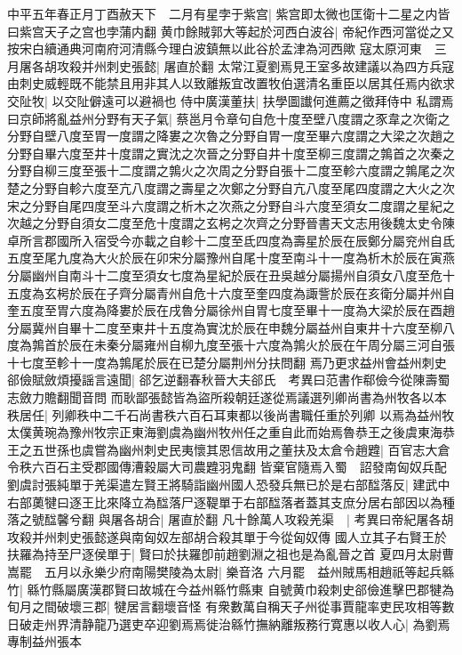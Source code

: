 中平五年春正月丁酉赦天下　二月有星孛于紫宫|{
	紫宫即太微也匡衛十二星之内皆曰紫宫天子之宫也孛蒲内翻}
黄巾餘賊郭大等起於河西白波谷|{
	帝紀作西河當從之又按宋白續通典河南府河清縣今理白波鎮無以此谷於孟津為河西歟}
寇太原河東　三月屠各胡攻殺并州刺史張懿|{
	屠直於翻}
太常江夏劉焉見王室多故建議以為四方兵寇由刺史威輕既不能禁且用非其人以致離叛宜改置牧伯選清名重臣以居其任焉内欲求交阯牧|{
	以交阯僻遠可以避禍也}
侍中廣漢董扶|{
	扶學圖䜟何進薦之徵拜侍中}
私謂焉曰京師將亂益州分野有天子氣|{
	蔡邕月令章句自危十度至壁八度謂之豕韋之次衛之分野自壁八度至胃一度謂之降婁之次魯之分野自胃一度至畢六度謂之大梁之次趙之分野自畢六度至井十度謂之實沈之次晉之分野自井十度至柳三度謂之鶉首之次秦之分野自柳三度至張十二度謂之鶉火之次周之分野自張十二度至軫六度謂之鶉尾之次楚之分野自軫六度至亢八度謂之壽星之次鄭之分野自亢八度至尾四度謂之大火之次宋之分野自尾四度至斗六度謂之析木之次燕之分野自斗六度至須女二度謂之星紀之次越之分野自須女二度至危十度謂之玄枵之次齊之分野晉書天文志用後魏太史令陳卓所言郡國所入宿受今亦載之自軫十二度至氐四度為壽星於辰在辰鄭分屬兖州自氐五度至尾九度為大火於辰在卯宋分屬豫州自尾十度至南斗十一度為析木於辰在寅燕分屬幽州自南斗十二度至須女七度為星紀於辰在丑吳越分屬揚州自須女八度至危十五度為玄枵於辰在子齊分屬青州自危十六度至奎四度為諏訾於辰在亥衛分屬并州自奎五度至胃六度為降婁於辰在戌魯分屬徐州自胃七度至畢十一度為大梁於辰在酉趙分屬冀州自畢十二度至東井十五度為實沈於辰在申魏分屬益州自東井十六度至柳八度為鶉首於辰在未秦分屬雍州自柳九度至張十六度為鶉火於辰在午周分屬三河自張十七度至軫十一度為鶉尾於辰在已楚分屬荆州分扶問翻}
焉乃更求益州會益州刺史郤儉賦斂煩擾謡言遠聞|{
	郤乞逆翻春秋晉大夫郤氏　考異曰范書作郗儉今從陳壽蜀志斂力贍翻聞音問}
而耿鄙張懿皆為盜所殺朝廷遂從焉議選列卿尚書為州牧各以本秩居任|{
	列卿秩中二千石尚書秩六百石耳東都以後尚書職任重於列卿}
以焉為益州牧太僕黄琬為豫州牧宗正東海劉虞為幽州牧州任之重自此而始焉魯恭王之後虞東海恭王之五世孫也虞嘗為幽州刺史民夷懷其恩信故用之董扶及太倉令趙韙|{
	百官志大倉令秩六百石主受郡國傳漕穀屬大司農韙羽鬼翻}
皆棄官隨焉入蜀　詔發南匈奴兵配劉虞討張純單于羌渠遣左賢王將騎詣幽州國人恐發兵無已於是右部䤈落反|{
	建武中右部薁犍曰逐王比來降立為䤈落尸逐鞮單于右部䤈落者蓋其支庶分居右部因以為種落之號䤈馨兮翻}
與屠各胡合|{
	屠直於翻}
凡十餘萬人攻殺羌渠　|{
	考異曰帝紀屠各胡攻殺并州刺史張懿遂與南匈奴左部胡合殺其單于今從匈奴傳}
國人立其子右賢王於扶羅為持至尸逐侯單于|{
	賢曰於扶羅卽前趙劉淵之祖也是為亂晉之首}
夏四月太尉曹嵩罷　五月以永樂少府南陽樊陵為太尉|{
	樂音洛}
六月罷　益州賊馬相趙祇等起兵緜竹|{
	緜竹縣屬廣漢郡賢曰故城在今益州緜竹縣東}
自號黄巾殺刺史郤儉進擊巴郡犍為旬月之間破壞三郡|{
	犍居言翻壞音怪}
有衆數萬自稱天子州從事賈龍率吏民攻相等數日破走州界清静龍乃選吏卒迎劉焉焉徙治緜竹撫納離叛務行寛惠以收人心|{
	為劉焉專制益州張本}
